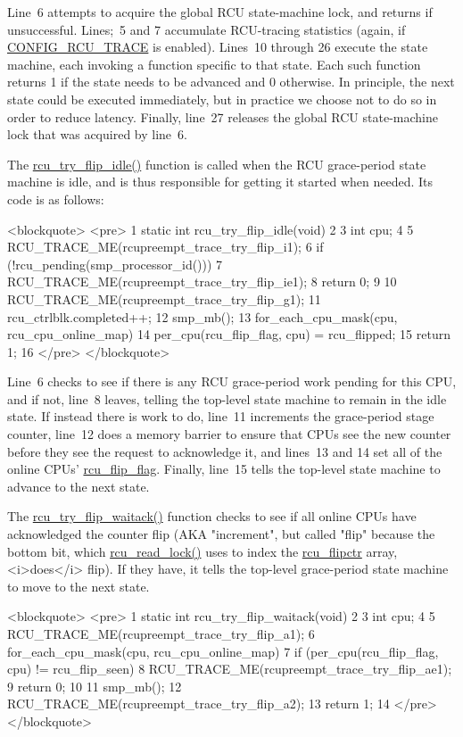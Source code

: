 Line~6 attempts to acquire the global RCU state-machine lock,
and returns if unsuccessful.
Lines;~5 and 7 accumulate RCU-tracing statistics (again, if
\url{CONFIG_RCU_TRACE} is enabled).
Lines~10 through 26 execute the state machine,
each invoking a function specific to that state.
Each such function returns 1 if the state needs to be advanced and
0 otherwise.
In principle, the next state could be executed immediately,
but in practice we choose not to do so in order to reduce latency.
Finally, line~27 releases the global RCU state-machine lock
that was acquired by line~6.

The \url{rcu_try_flip_idle()} function is called when the
RCU grace-period state machine is idle, and is thus responsible for
getting it started when needed.
Its code is as follows:

<blockquote>
<pre>  1 static int rcu_try_flip_idle(void)
  2 {
  3   int cpu;
  4 
  5   RCU_TRACE_ME(rcupreempt_trace_try_flip_i1);
  6   if (!rcu_pending(smp_processor_id())) {
  7     RCU_TRACE_ME(rcupreempt_trace_try_flip_ie1);
  8     return 0;
  9   }
 10   RCU_TRACE_ME(rcupreempt_trace_try_flip_g1);
 11   rcu_ctrlblk.completed++;
 12   smp_mb();
 13   for_each_cpu_mask(cpu, rcu_cpu_online_map)
 14     per_cpu(rcu_flip_flag, cpu) = rcu_flipped;
 15   return 1;
 16 }
</pre>
</blockquote>

Line~6 checks to see if there is any RCU grace-period work
pending for this CPU, and if not, line~8 leaves, telling
the top-level state machine to remain in the idle state.
If instead there is work to do, line~11 increments the
grace-period stage counter, line~12 does a memory barrier
to ensure that CPUs see the new counter before they see the
request to acknowledge it, and lines~13 and 14 set all of
the online CPUs' \url{rcu_flip_flag}.
Finally, line~15 tells the top-level state machine to
advance to the next state.

The \url{rcu_try_flip_waitack()} function checks to see
if all online CPUs have acknowledged the counter flip (AKA "increment",
but called "flip" because the bottom bit, which \url{rcu_read_lock()}
uses to index the \url{rcu_flipctr} array, <i>does</i> flip).
If they have, it tells the top-level grace-period state machine to
move to the next state.

<blockquote>
<pre>  1 static int rcu_try_flip_waitack(void)
  2 {
  3   int cpu;
  4 
  5   RCU_TRACE_ME(rcupreempt_trace_try_flip_a1);
  6   for_each_cpu_mask(cpu, rcu_cpu_online_map)
  7     if (per_cpu(rcu_flip_flag, cpu) != rcu_flip_seen) {
  8       RCU_TRACE_ME(rcupreempt_trace_try_flip_ae1);
  9       return 0;
 10     }
 11   smp_mb();
 12   RCU_TRACE_ME(rcupreempt_trace_try_flip_a2);
 13   return 1;
 14 }
</pre>
</blockquote>

